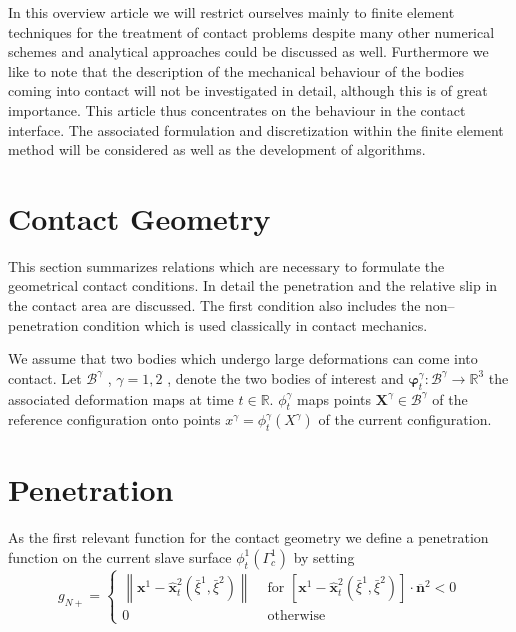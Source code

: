 In this overview article we will restrict ourselves mainly to ﬁnite element techniques for
the treatment of contact problems despite many other numerical schemes and analytical
approaches could be discussed as well. Furthermore we like to note that the description
of the mechanical behaviour of the bodies coming into contact will not be investigated in
detail, although this is of great importance. This article thus concentrates on the behaviour
in the contact interface. The associated formulation and discretization within the ﬁnite
element method will be considered as well as the development of algorithms.
\section{Contact Geometry}
This section summarizes relations which are necessary to formulate the geometrical contact
conditions. In detail the penetration and the relative slip in the contact area are discussed.
The ﬁrst condition also includes the non–penetration condition which is used classically in
contact mechanics.

We assume that two bodies which undergo large deformations can come into contact.
Let $\mathcal{B}^\gamma$ , $ \gamma= 1, 2$ , denote the two bodies of interest and $\boldsymbol{\varphi}_{t}^{\gamma}: \mathcal{B}^{\gamma} \rightarrow \mathbb{R}^{3}$ the associated
deformation maps at time $t \in \mathbb{R}$. $\phi_t^{\gamma}$ maps points $\boldsymbol{X}^\gamma \in \mathcal{B}^\gamma$ of the reference conﬁguration
onto points $x^\gamma = \phi ^\gamma_t(X^\gamma)$ of the current conﬁguration.

\section{Penetration}
As the ﬁrst relevant function for the contact geometry we deﬁne a penetration function on
the current slave surface $\phi _t^1(\Gamma_c^1)$ by setting
\begin{equation}
 g_{N+}=\left\{\begin{array}{ll}\left\|\mathbf{x}^{1}-\hat{\mathbf{x}}_{t}^{2}\left(\bar{\xi}^{1}, \bar{\xi}^{2}\right)\right\| & \text { for }\left[\mathbf{x}^{1}-\hat{\mathbf{x}}_{t}^{2}\left(\bar{\xi}^{1}, \bar{\xi}^{2}\right)\right] \cdot \overline{\mathbf{n}}^{2}<0 \\ 0 & \text { otherwise }\end{array}\right. 
 \label{eqn:4.1} 
\end{equation}

